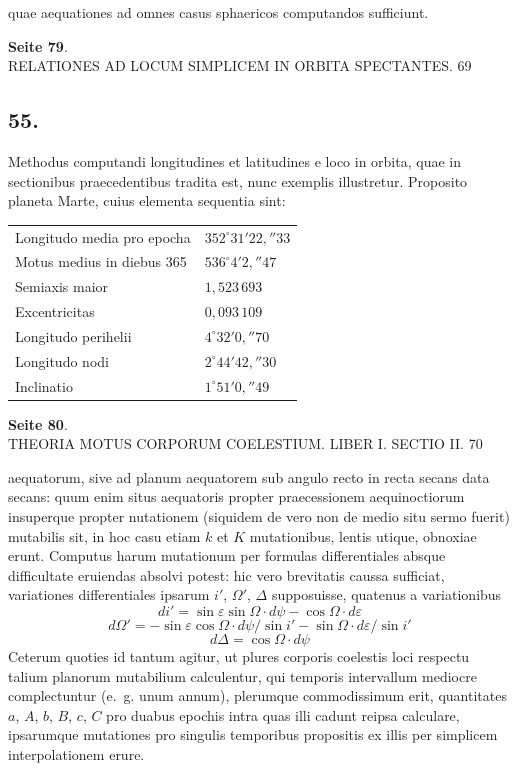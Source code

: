 \documentclass[12pt,a4paper]{article}
\begin{document}
quae aequationes ad omnes casus sphaericos computandos sufficiunt.

\textbf{Seite 79}.\\
RELATIONES AD LOCUM SIMPLICEM IN ORBITA SPECTANTES. 69

\subsection*{55.}

Methodus computandi longitudines et latitudines e loco in orbita, quae in sectionibus praecedentibus tradita est, nunc exemplis illustretur. Proposito planeta Marte, cuius elementa sequentia sint:

\begin{center}
\begin{tabular}{l@{\;\ldots\ldots\;}l}
Longitudo media pro epocha & $352^\circ 31' 22{,}''33$ \\
Motus medius in diebus 365 & $536^\circ 4' 2{,}''47$ \\
Semiaxis maior & $1{,}523\,693$ \\
Excentricitas & $0{,}093\,109$ \\
Longitudo perihelii & $4^\circ 32' 0{,}''70$ \\
Longitudo nodi & $2^\circ 44' 42{,}''30$ \\
Inclinatio & $1^\circ 51' 0{,}''49$ \\
\end{tabular}
\end{center}

\textbf{Seite 80}.\\
THEORIA MOTUS CORPORUM COELESTIUM. LIBER I. SECTIO II. 70

aequatorum, sive ad planum aequatorem sub angulo recto in recta secans data secans: quum enim situs aequatoris propter praecessionem aequinoctiorum insuperque propter nutationem (siquidem de vero non de medio situ sermo fuerit) mutabilis sit, in hoc casu etiam $k$ et $K$ mutationibus, lentis utique, obnoxiae erunt. Computus harum mutationum per formulas differentiales absque difficultate eruiendas absolvi potest: hic vero brevitatis caussa sufficiat, variationes differentiales ipsarum $i'$, $\Omega'$, $\Delta$ supposuisse, quatenus a variationibus
\[
di' = \sin \varepsilon \sin \Omega \cdot d\psi - \cos \Omega \cdot d\varepsilon
\]
\[
d\Omega' = -\sin \varepsilon \cos \Omega \cdot d\psi / \sin i' - \sin \Omega \cdot d\varepsilon / \sin i'
\]
\[
d\Delta = \cos \Omega \cdot d\psi
\]
Ceterum quoties id tantum agitur, ut plures corporis coelestis loci respectu talium planorum mutabilium calculentur, qui temporis intervallum mediocre complectuntur (e.~g. unum annum), plerumque commodissimum erit, quantitates $a$, $A$, $b$, $B$, $c$, $C$ pro duabus epochis intra quas illi cadunt reipsa calculare, ipsarumque mutationes pro singulis temporibus propositis ex illis per simplicem interpolationem erure.
\end{document}
